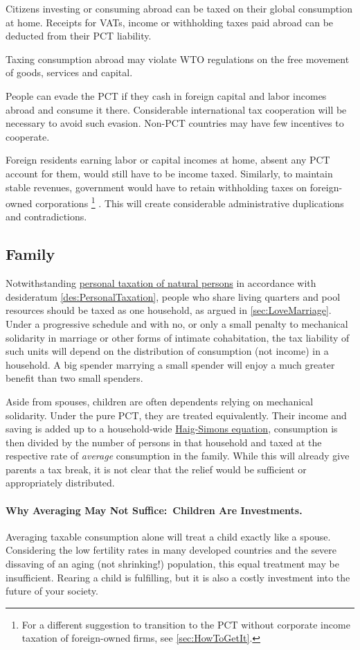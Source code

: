 Citizens investing or consuming abroad can be taxed on their global consumption at home.
Receipts for VATs, income or withholding taxes paid abroad can be deducted from their PCT liability.

Taxing consumption abroad may violate WTO regulations on the free movement of goods, services and capital.

People can evade the PCT if they cash in foreign capital and labor incomes abroad and consume it there.
Considerable international tax cooperation will be necessary to avoid such evasion.
Non-PCT countries may have few incentives to cooperate.

Foreign residents earning labor or capital incomes at home, absent any PCT account for them, would still have to be income taxed.
Similarly, to maintain stable revenues, government would have to retain withholding taxes on foreign-owned corporations
\footnote{
	For a different suggestion to transition to the PCT without corporate income taxation of foreign-owned firms, see \autoref{sec:HowToGetIt}.
}
.
This will create considerable administrative duplications and contradictions.

\subsection{Family} Notwithstanding \hyperref[des:PersonalTaxation]{personal taxation of natural persons} in accordance with desideratum \ref{des:PersonalTaxation}, people who share living quarters and pool resources should be taxed as one household, as argued in \autoref{sec:LoveMarriage}.
Under a progressive schedule and with no, or only a small penalty to mechanical solidarity in marriage or other forms of intimate cohabitation, the tax liability of such units will depend on the distribution of consumption (not income) in a household.
A big spender marrying a small spender will enjoy a much greater benefit than two small spenders.

Aside from spouses, children are often dependents relying on mechanical solidarity.
Under the pure PCT, they are treated equivalently.
Their income and saving is added up to a household-wide \hyperref[eq:HaigSimons]{Haig-Simons equation}, consumption is then divided by the number of persons in that household and taxed at the respective rate of \emph{average} consumption in the family.
While this will already give parents a tax break, it is not clear that the relief would be sufficient or appropriately distributed.

\paragraph{Why Averaging May Not Suffice:~Children Are Investments.} Averaging taxable consumption alone will treat a child exactly like a spouse.
Considering the low fertility rates in many developed countries and the severe dissaving of an aging (not shrinking!) population, this equal treatment may be insufficient.
Rearing a child is fulfilling, but it is also a costly investment into the future of your society.

